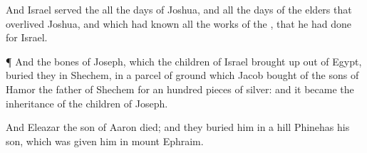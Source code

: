 {And
Israel
served the
{} all the
days of
Joshua, and all the
days of the
elders that
overlived
Joshua, and which had
known all the
works of the
{}, that he had
done for
Israel.


\par }{\PP {}¶ And the
bones of
Joseph, which the
children of
Israel brought
up out of
Egypt,
buried they in
Shechem, in a
parcel of
ground which
Jacob
bought of the
sons of
Hamor the
father of
Shechem for an
hundred pieces of
silver: and it became the
inheritance of the
children of
Joseph.

And
Eleazar the
son of
Aaron
died; and they
buried him in a
hill
{}
Phinehas his
son, which was
given him in
mount
Ephraim.


\par }